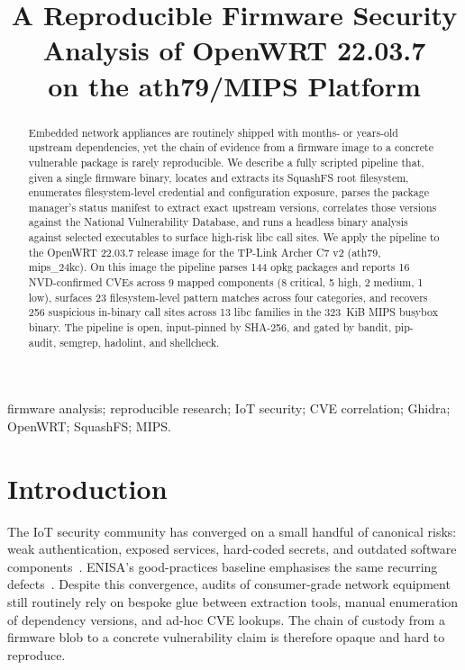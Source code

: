 \documentclass[conference]{IEEEtran}
\title{A Reproducible Firmware Security Analysis of OpenWRT 22.03.7\\
       on the ath79/MIPS Platform}
\author{
    \IEEEauthorblockN{Ali Murtaza Bhutto}
    \IEEEauthorblockA{Independent Researcher\\
                     ORCID: 0009-0007-2787-943X\\
                     alibhutto101112@gmail.com}
}
\begin{document}
\maketitle

\begin{abstract}
Embedded network appliances are routinely shipped with months- or
years-old upstream dependencies, yet the chain of evidence from a
firmware image to a concrete vulnerable package is rarely
reproducible. We describe a fully scripted pipeline that, given a
single firmware binary, locates and extracts its SquashFS root
filesystem, enumerates filesystem-level credential and configuration
exposure, parses the package manager's status manifest to extract
exact upstream versions, correlates those versions against the
National Vulnerability Database, and runs a headless binary analysis
against selected executables to surface high-risk libc call sites.
We apply the pipeline to the OpenWRT 22.03.7 release image for the
TP-Link Archer C7 v2 (ath79, mips\_24kc). On this image the
pipeline parses 144 opkg packages and reports 16 NVD-confirmed CVEs
across 9 mapped components (8 critical, 5 high, 2 medium, 1 low),
surfaces 23 filesystem-level pattern matches across four categories,
and recovers 256 suspicious in-binary call sites across 13 libc
families in the 323~KiB MIPS busybox binary. The pipeline is open,
input-pinned by SHA-256, and gated by bandit, pip-audit, semgrep,
hadolint, and shellcheck.
\end{abstract}

\begin{IEEEkeywords}
firmware analysis; reproducible research; IoT security; CVE
correlation; Ghidra; OpenWRT; SquashFS; MIPS.
\end{IEEEkeywords}

\section{Introduction}

The IoT security community has converged on a small handful of
canonical risks: weak authentication, exposed services, hard-coded
secrets, and outdated software components~\cite{owaspIoT,nistIR8259}.
ENISA's good-practices baseline emphasises the same recurring
defects~\cite{enisaIoT}. Despite this convergence, audits of
consumer-grade network equipment still routinely rely on bespoke
glue between extraction tools, manual enumeration of dependency
versions, and ad-hoc CVE lookups. The chain of custody from a
firmware blob to a concrete vulnerability claim is therefore opaque
and hard to reproduce.
\end{document}
